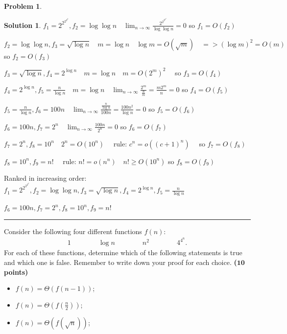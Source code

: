 \documentclass{article}
\theoremstyle{definition}
\newtheorem{problem}{Problem}
\def\fline{\rule{0.75\linewidth}{0.5pt}}
\newcommand{\finishline}{\begin{center}\fline\end{center}}
\newtheorem*{solution*}{Solution}
\newenvironment{solution}{\begin{solution*}}{{\finishline} \end{solution*}}
\newcommand{\grade}[1]{\hfill{\textbf{($\mathbf{#1}$ points)}}}
\begin{document}
\begin{problem}
\begin{enumerate}
\begin{solution}
	\item $f_1 =  2^{2^{2^{2^{2}}}}, f_2 = \log\log n \quad \lim_{n \to \infty}\frac{ 2^{2^{2^{2^{2}}}} }{\log\log n} = 0$ so $f_1 = O(f_2)$
	\item $f_2 = \log \log n, f_3 = \sqrt{\log{n}} \quad m = \log n \quad \log m = O(\sqrt{m}) \quad => (\log m)^2 = O(m)$ so $f_2 = O(f_3)$
	\item $f_3 = \sqrt{\log n}, f_4 = 2^{\log n} \quad m = \log n \quad  m = O(2^m)^2 \quad$ so $f_3 = O(f_4)$
	\item $f_4 =  2^{\log n} , f_5 = \frac{n}{\log n}  \quad m = \log n \quad \lim_{n \to \infty}\frac{ 2^m}{\frac{n}{m}} = \frac{ m2^m}{n} = 0$ \quad so $f_4 = O(f_5)$
	\item $f_5 = \frac{n}{\log n}, f_6 = 100n \quad \lim_{n \to \infty}\frac{\frac{n}{\log n}}{100n} = \frac{100n^2}{\log n} = 0$ \quad so $f_5 = O(f_6)$
	\item $f_6 = 100n, f_7 = 2^n \quad  \lim_{n \to \infty}\frac{100n}{2^n} = 0$ \quad so $f_6 = O(f_7)$
	\item $f_7 = 2^n, f_8 = 10^n \quad 2^n = O(10^n) \quad$ rule: $c^n = o((c+1)^n) \quad$ so $f_7 = O(f_8)$
	\item $f_8 = 10^n, f_9 = n! \quad$ rule: $n! = o(n^n) \quad n! \geq O(10^n)$ so $f_8 = O(f_9)$
	\item Ranked in increasing order: $f_1 =  2^{2^{2^{2^{2}}}}, f_2 = \log\log n,  f_3 = \sqrt{\log{n}}, f_4 = 2^{\log n},  f_5 = \frac{n}{\log n}$
	\item $f_6 = 100n,  f_7 = 2^n,  f_8 = 10^n,  f_9 = n!$

\end{solution}
	
	\item[(b)]  Consider the following four different functions $f(n)$: 
	  \begin{align*}
	    1 \qquad\qquad  \log n \qquad\qquad  n^2  \qquad\qquad  4^{4^{n}}.
	  \end{align*} 
	 For each of these functions, determine which of the following statements is true and which one is false. Remember to write down your proof for each choice.    \grade{10} 
	\begin{itemize}
        \item $f(n) = \Theta(f(n-1))$;
        \item $f(n) = \Theta(f(\frac{n}{2}))$;
        \item $f(n) = \Theta(f(\sqrt n))$;
    \end{itemize}
    

\end{enumerate}
\end{problem}
\end{document}
